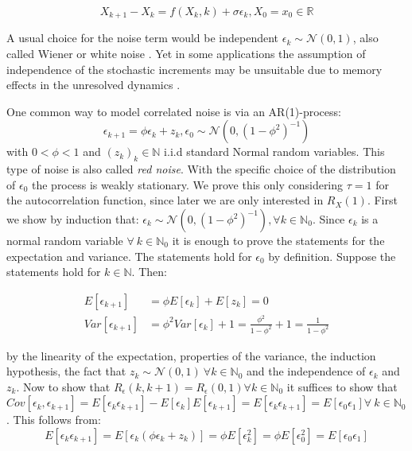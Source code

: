 \documentclass[%
thesis=student,%
coverpage=false,%
titlepage=false,%
headmarks=true, %
english,%
font=libertine, %
math=newpxtx, %
BCOR=5mm,%
coverBCOR=11mm%
]{tumbook}
\begin{document}
\begin{equation}
    X_{k+1}-X_{k} = f(X_{k},k) + \sigma\epsilon_{k}, X_{0} = x_{0} \in \mathbb{R}
    \label{eq:discrete-time modelling}
\end{equation}

A usual choice for the noise term would be independent $\epsilon_{k} \sim \mathcal{N}(0,1)$, also called Wiener or white noise \cite{zwanzig:2001}.
Yet in some applications the assumption of independence of the stochastic increments may be unsuitable due to memory effects in the unresolved dynamics \cite{zwanzig:1961,chorin:2000}.

One common way to model correlated noise is via an AR(1)-process:
\[
\epsilon_{k+1} = \phi\epsilon_{k} + z_{k}, \epsilon_{0} \sim \mathcal{N}(0,(1-\phi^2)^{-1})
\]
with $0<\phi<1$ and $(z_{k})_{k}\in\mathbb{N}$ i.i.d standard Normal random variables. This type of noise is also called \textit{red noise}. With the specific choice of the distribution of $\epsilon_{0}$ the process is weakly stationary. We prove this only considering $\tau = 1$ for the autocorrelation function, since later we are only interested in $R_{X}(1)$. First we show by induction that: $\epsilon_{k} \sim \mathcal{N}(0,(1-\phi^2)^{-1}), \forall k \in \mathbb{N}_{0}$. Since $\epsilon_{k}$ is a normal random variable $\forall \ k \in \mathbb{N}_{0}$ it is enough to prove the statements for the expectation and variance. The statements hold for $\epsilon_{0}$ by definition. Suppose the statements hold for $k \in \mathbb{N}$. Then:

\begin{subequations}
    \begin{align}
        E[\epsilon_{k+1}] &= \phi E[\epsilon_{k}] + E[z_{k}]  = 0 \\
        Var[\epsilon_{k+1}] &= \phi^2 Var[\epsilon_{k}] + 1 = \frac{\phi^2}{1-\phi^2} + 1 = \frac{1}{1-\phi^2}     
    \end{align}
\end{subequations}   

by the linearity of the expectation, properties of the variance, the induction hypothesis, the fact that $z_{k} \sim \mathcal{N}(0,1) \ \forall k \in \mathbb{N}_{0}$ and the independence of $\epsilon_{k}$ and $z_{k}$. Now to show that $R_{\epsilon}(k,k+1) = R_{\epsilon}(0,1) \forall k \in \mathbb{N}_{0}$ it suffices to show that $Cov[\epsilon_{k},\epsilon_{k+1}] = E[\epsilon_{k}\epsilon_{k+1}] - E[\epsilon_{k}]E[\epsilon_{k+1}] = E[\epsilon_{k}\epsilon_{k+1}] = E[\epsilon_{0}\epsilon_{1}] \forall \ k \in \mathbb{N}_{0}$. This follows from: 
\[
E[\epsilon_{k}\epsilon_{k+1}] = E[\epsilon_{k}(\phi\epsilon_{k} + z_{k})] = \phi E[\epsilon_{k}^2] = \phi E[\epsilon_{0}^2] = E[\epsilon_{0}\epsilon_{1}]
\]
\end{document}
